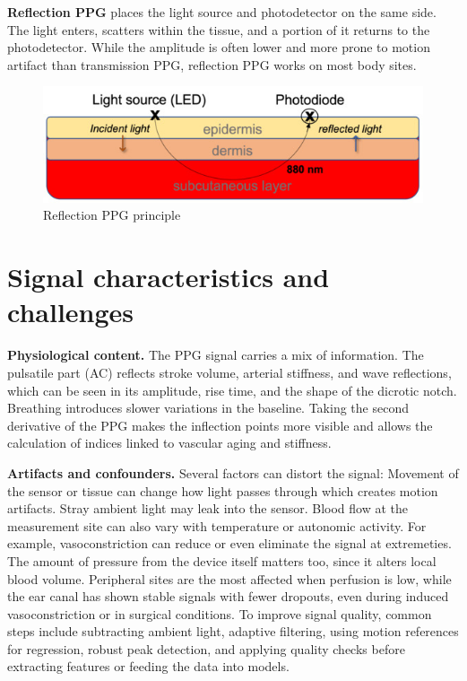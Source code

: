 \textbf{Reflection PPG} places the light source and photodetector on the same side. The light enters, scatters within the tissue, and a portion of it returns to the photodetector. While the amplitude is often lower and more prone to motion artifact than transmission PPG, reflection PPG works on most body sites.\cite{castaneda_review_2018,azudin_principles_2023}
\begin{figure}[H]
    \centering
    \includegraphics[scale=0.75]{Figures/Reflection_ppg.jpg}
    \caption{Reflection PPG principle}
    \label{fig:reflection_ppg}
\end{figure}

\section{Signal characteristics and challenges}
\label{sec:Signal characteristics and challenges}

\textbf{Physiological content.}  
The PPG signal carries a mix of information. The pulsatile part (AC) reflects stroke volume, arterial stiffness, and wave reflections, which can be seen in its amplitude, rise time, and the shape of the dicrotic notch. Breathing introduces slower variations in the baseline. Taking the second derivative of the PPG makes the inflection points more visible and allows the calculation of indices linked to vascular aging and stiffness.\cite{castaneda_review_2018,azudin_principles_2023}

\textbf{Artifacts and confounders.}  
Several factors can distort the signal: Movement of the sensor or tissue can change how light passes through which creates motion artifacts. Stray ambient light may leak into the sensor. Blood flow at the measurement site can also vary with temperature or autonomic activity. For example, vasoconstriction can reduce or even eliminate the signal at extremeties. The amount of pressure from the device itself matters too, since it alters local blood volume. Peripheral sites are the most affected when perfusion is low, while the ear canal has shown stable signals with fewer dropouts, even during induced vasoconstriction or in surgical conditions.\cite{budidha_human_2014,venema_robustness_2014} To improve signal quality, common steps include subtracting ambient light, adaptive filtering, using motion references for regression, robust peak detection, and applying quality checks before extracting features or feeding the data into models.\cite{castaneda_review_2018,azudin_principles_2023}

